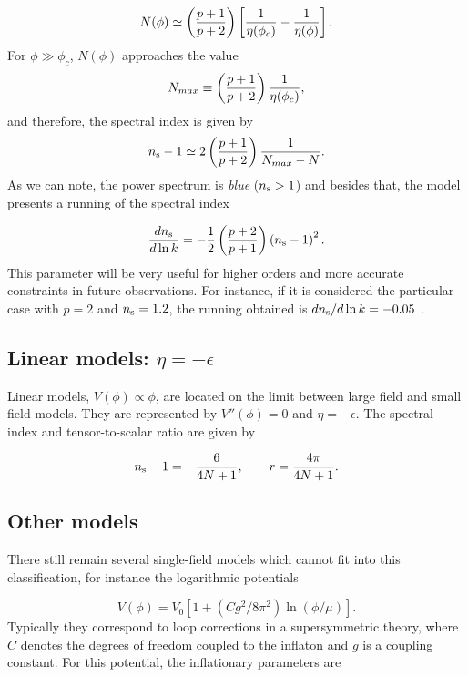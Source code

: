 \documentclass{rmaa}
\def\beq{\begin{equation}}
\def\eeq{\end{equation}}
\begin{document}
\beq
N(\phi)\simeq \left( {p+1 \over p+2} \right)\left[ {1 \over \eta(\phi_c) }- {1 \over \eta(\phi)}\right]. 
\eeq
%
For $\phi \gg \phi_c$, $N(\phi)$ approaches the value
%
\beq
N_{max}\equiv \left( {p+1 \over p+2} \right) {1 \over \eta (\phi_c)},
\eeq
%
and therefore, the spectral index is given by
 $$
n_{\rm s}-1 \simeq 2 \left( \frac{p+1}{p+2}\right) \frac{1}{N_{max}-N}.
 $$
%
As we can note, the power spectrum is \textit{blue} ($n_{\rm s}>1$) and besides that, the model presents 
a running of the spectral index

\begin{equation}
\label{eq:dsirunning}
{dn_{\rm s} \over d\ln{k}} = -{1 \over 2} \left({p + 2 \over p + 1}\right) 
\left(n_{\rm s} - 1\right)^2.
\end{equation}
%
 This parameter  will be very useful for higher orders and more accurate constraints in 
 future observations. For instance, if it is considered the particular case with $p = 2$ 
 and $n_{\rm s} = 1.2$, the running obtained is $dn_{\rm s} / d\ln{k} = -0.05$ \citep{Kinney3}. 

\subsection{Linear models: $\eta = - \epsilon$}


Linear models, $V\left(\phi\right) \propto \phi$, are located on the limit between
large field and small field models. They are represented by $V''\left(\phi\right) = 0$ and $\eta =
- \epsilon$. The spectral index and tensor-to-scalar ratio are given by 

\beq
n_{\rm s}-1=-{6\over 4N+1},\qquad
r = {4\pi \over 4N+1} .
\eeq

\subsection{Other models}

There still remain several single-field models which cannot fit into this classification, 
for instance the logarithmic potentials \citep{Barrow2}

\beq
V\left(\phi\right) =V_0\left[1+(C g^2/8\pi^2)
\ln\left(\phi/\mu\right)\right].
\eeq
%
Typically they correspond to loop corrections in a supersymmetric theory,
where $C$ denotes the degrees of freedom coupled
to the inflaton and $g$ is a coupling constant.  
%
For this potential, the inflationary parameters are
\end{document}

